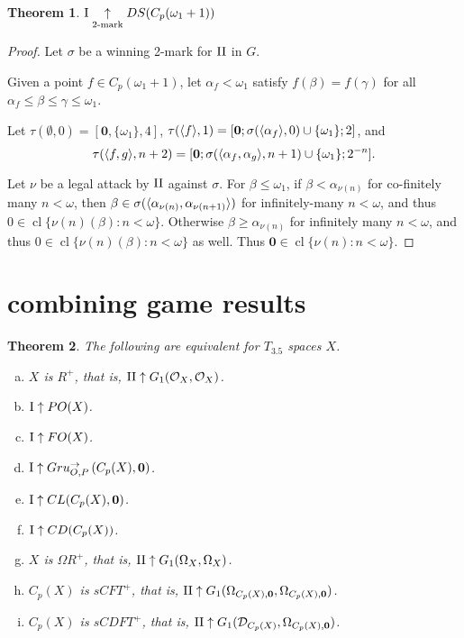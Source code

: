 \documentclass[11pt]{article}
\theoremstyle{plain}
\newtheorem{theorem}{Theorem}
\theoremstyle{definition}
\theoremstyle{remark}
\theoremstyle{plain}
\theoremstyle{definition}
\theoremstyle{remark}
\begin{document}
\begin{theorem}
  \(\mathrm{I}\underset{2\text{-mark}}{\uparrow}DS(C_p(\omega_1+1))\)
\end{theorem}
\begin{proof}
  Let \(\sigma\) be a winning 2-mark for \(\mathrm{II}\) in \(G\).

  Given a point \(f\in C_p(\omega_1+1)\),
  let \(\alpha_f<\omega_1\) satisfy \(f(\beta)=f(\gamma)\) for all
  \(\alpha_f\leq\beta\leq\gamma\leq\omega_1\).

  Let \(\tau(\emptyset,0)=[\mathbf{0},\{\omega_1\},4]\),
  \(\tau(\langle f\rangle,1)=[\mathbf{0};\sigma(\langle\alpha_f\rangle,0)\cup\{\omega_1\};2]\), and
  \[\tau(\langle f,g\rangle,n+2)=[\mathbf{0};\sigma(\langle\alpha_f,\alpha_g\rangle,n+1)\cup\{\omega_1\};2^{-n}].\]

  Let \(\nu\) be a legal attack by \(\mathrm{II}\) against \(\sigma\).
  For \(\beta\leq\omega_1\), if \(\beta<\alpha_{\nu(n)}\)
  for co-finitely many \(n<\omega\), then
  \(\beta\in\sigma(\langle\alpha_{\nu(n)},\alpha_{\nu(n+1)}\rangle)\) for
  infinitely-many \(n<\omega\), and thus \(0\in\operatorname{cl}\{\nu(n)(\beta):n<\omega\}\).
  Otherwise \(\beta\geq\alpha_{\nu(n)}\) for infinitely many \(n<\omega\),
  and thus \(0\in\operatorname{cl}\{\nu(n)(\beta):n<\omega\}\) as well.
  Thus \(\mathbf{0}\in\operatorname{cl}\{\nu(n):n<\omega\}\).
\end{proof}

\section{combining game results}

\begin{theorem}
The following are equivalent for \(T_{3.5}\) spaces \(X\).
\begin{enumerate}[a)]
\item \(X\) is \(R^+\), that is, \(\mathrm{II}\uparrow G_{1}(\mathcal{O}_X,\mathcal{O}_X)\).
\item \(\mathrm{I}\uparrow PO(X)\). 
\item \(\mathrm{I}\uparrow FO(X)\).
\item \(\mathrm{I}\uparrow Gru_{O,P}^{\to}\left({C_p(X)},{\mathbf 0}\right)\).
\item \(\mathrm{I}\uparrow CL(C_p(X),\mathbf 0)\).
\item \(\mathrm{I}\uparrow CD(C_p(X))\).
\item \(X\) is \(\Omega R^+\), that is, 
  \(\mathrm{II}\uparrow G_{1}(\Omega_X,\Omega_X)\).
\item \(C_p(X)\) is \(sCFT^+\), that is, 
  \(\mathrm{II}\uparrow G_{1}(\Omega_{C_p(X),\mathbf 0},\Omega_{C_p(X),\mathbf 0})\).
\item \(C_p(X)\) is \(sCDFT^+\), that is,
  \(\mathrm{II}\uparrow G_{1}(\mathcal{D}_{C_p(X)},\Omega_{C_p(X),\mathbf 0})\).
\end{enumerate}
\end{theorem}
\end{document}
